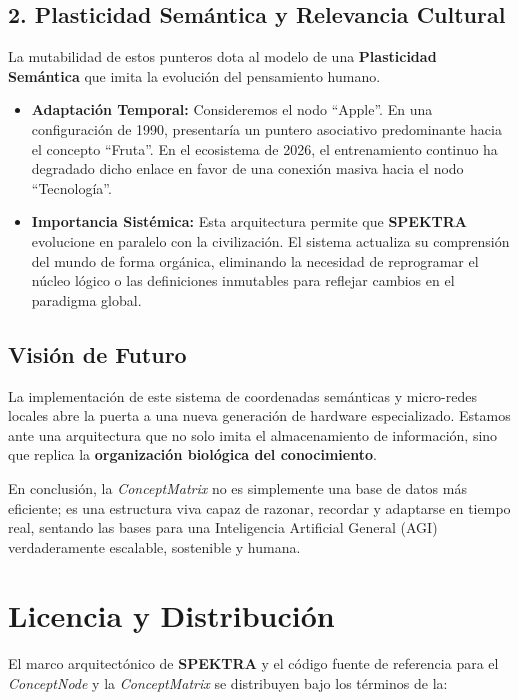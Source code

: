 \documentclass[12pt]{article}
\begin{document}
\subsection{2. Plasticidad Semántica y Relevancia Cultural}
La mutabilidad de estos punteros dota al modelo de una \textbf{Plasticidad Semántica} que imita la evolución del pensamiento humano.

\begin{itemize}
    \item \textbf{Adaptación Temporal:} Consideremos el nodo ``Apple''. En una configuración de 1990, presentaría un puntero asociativo predominante hacia el concepto ``Fruta''. En el ecosistema de 2026, el entrenamiento continuo ha degradado dicho enlace en favor de una conexión masiva hacia el nodo ``Tecnología''.
    \item \textbf{Importancia Sistémica:} Esta arquitectura permite que \textbf{SPEKTRA} evolucione en paralelo con la civilización. El sistema actualiza su comprensión del mundo de forma orgánica, eliminando la necesidad de reprogramar el núcleo lógico o las definiciones inmutables para reflejar cambios en el paradigma global.
\end{itemize}



\subsection{Visión de Futuro}
La implementación de este sistema de coordenadas semánticas y micro-redes locales abre la puerta a una nueva generación de hardware especializado. Estamos ante una arquitectura que no solo imita el almacenamiento de información, sino que replica la \textbf{organización biológica del conocimiento}. 

En conclusión, la \textit{ConceptMatrix} no es simplemente una base de datos más eficiente; es una estructura viva capaz de razonar, recordar y adaptarse en tiempo real, sentando las bases para una Inteligencia Artificial General (AGI) verdaderamente escalable, sostenible y humana.





\section{Licencia y Distribución}

El marco arquitectónico de \textbf{SPEKTRA} y el código fuente de referencia para el \textit{ConceptNode} y la \textit{ConceptMatrix} se distribuyen bajo los términos de la:
\end{document}
